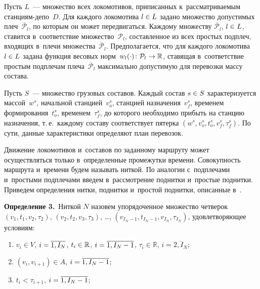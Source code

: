 \begin{multicols}{2}
\smallskip

Пусть $L$~--- множество всех локомотивов, приписанных 
к~рассматриваемым стан\-ци\-ям-де\-по~$D$. Для каждого локомотива 
$l\hm\in L$ задано множество допустимых плеч~$\overline {\mathcal P}_l$, 
по которым он может передвигаться. Каждому множеству  
$\overline {\mathcal P}_l$, $l\hm\in L$, ставится в~соответствие 
множество~$\mathcal P_l$, составленное из всех простых подплеч, 
входящих в~плечи множества~$\overline {\mathcal P}_l$. Предполагается, что 
для каждого локомотива $l\hm\in L$ задана функция весовых 
норм~$w_l (\cdot) \colon {\mathcal P}_l \hm\to \mathbb{R}$, ставящая в~соответствие 
простым подплечам плеча~$\overline {\mathcal P}_l$ максимально допустимую 
для перевозки массу состава.

Пусть $S$~--- множество грузовых составов. Каж\-дый состав $s \hm\in S$ 
характеризуется массой~$w^s$, начальной станцией~$v^s_o$, станцией назначения~$v^s_f$, 
временем формирования~$t^s_o$, временем~$\tau^s_f$, до которого необходимо 
прибыть на станцию назначения, т.\,е.\ каждому составу соответствует пятерка
 $(w^s, v^s_o, t^s_o, v^s_f, \tau^s_f)$. По сути, данные характеристики 
 определяют план перевозок.

Движение локомотивов и~составов по заданному маршруту может 
осуществляться только в~определенные промежутки времени. Совокупность 
маршру\-та и~времени будем называть ниткой. По аналогии с~подплечами и~простыми 
подплечами введем в~рассмотрение поднитки и~простые поднитки. Приведем 
определения нитки, поднитки и~простой поднитки, описанные в~\cite{AzanovBuyanov}.

\smallskip

\noindent
\textbf{Определение 3.}\
    Ниткой $N$ назовем упорядоченное множество четверок 
    $(v_1, t_1, v_2, \tau_2)$, $(v_2, t_2, v_3, \tau_3)$, \ldots, 
    $(v_{I_N-1}, t_{I_N-1}, v_{I_N}, \tau_{I_N})$, удовлетворяющее условиям:
    \begin{enumerate}[(1)]

    \item
        $v_i \in V$, $i \hm= \overline{1, I_N}$, $t_i\hm \in \mathbb{R}$, $i \hm= \overline{1, I_N-1}$, $\tau_i \in \mathbb{R}$, $i = \overline{2, I_N}$;

    \item
        $(v_{i}, v_{i+1}) \in A$, $i \hm= \overline{1, I_N-1}$;

    \item
        $t_i < \tau_{i+1}$, $i\hm = \overline{1, I_N -1}$;


\end{enumerate}
\end{multicols}
